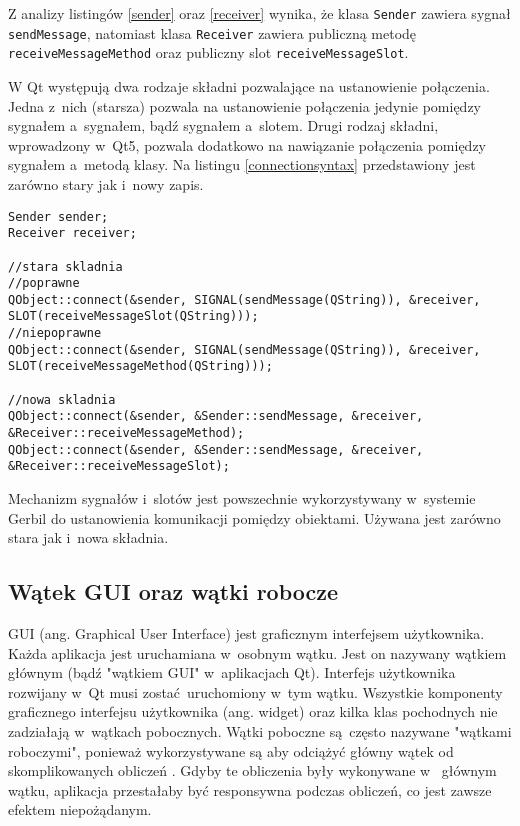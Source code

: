Z analizy listingów \ref{sender} oraz \ref{receiver} wynika, że klasa \lstinline{Sender} zawiera sygnał \lstinline{sendMessage}, natomiast klasa \lstinline{Receiver} zawiera publiczną metodę \lstinline{receiveMessageMethod} oraz publiczny slot \lstinline{receiveMessageSlot}.

W Qt występują dwa rodzaje składni pozwalające na ustanowienie połączenia. Jedna z~nich (starsza) pozwala na ustanowienie połączenia jedynie pomiędzy sygnałem a~sygnałem, bądź sygnałem a~slotem. Drugi rodzaj składni, wprowadzony w~Qt5, pozwala dodatkowo na nawiązanie połączenia pomiędzy sygnałem a~metodą klasy. Na listingu \ref{connectionsyntax} przedstawiony jest zarówno stary jak i~nowy zapis.

\begin{minipage}{\textwidth}
	\begin{lstlisting}[label=connectionsyntax, caption={Składnia tworzenia połączeń między obiektami},alsoletter={()[].=}]
Sender sender;
Receiver receiver;

//stara skladnia
//poprawne
QObject::connect(&sender, SIGNAL(sendMessage(QString)), &receiver, SLOT(receiveMessageSlot(QString)));
//niepoprawne
QObject::connect(&sender, SIGNAL(sendMessage(QString)), &receiver, SLOT(receiveMessageMethod(QString)));

//nowa skladnia
QObject::connect(&sender, &Sender::sendMessage, &receiver, &Receiver::receiveMessageMethod);
QObject::connect(&sender, &Sender::sendMessage, &receiver, &Receiver::receiveMessageSlot);
	\end{lstlisting}
\end{minipage}

Mechanizm sygnałów i~slotów jest powszechnie wykorzystywany w~systemie Gerbil do ustanowienia komunikacji pomiędzy obiektami. Używana jest zarówno stara jak i~nowa składnia.

\subsection{Wątek GUI oraz wątki robocze}
GUI (ang. Graphical User Interface) jest graficznym interfejsem użytkownika. Każda aplikacja jest uruchamiana w~osobnym wątku. Jest on nazywany wątkiem głównym (bądź "wątkiem GUI" w~aplikacjach Qt). Interfejs użytkownika rozwijany w~Qt musi zostać uruchomiony w~tym wątku. Wszystkie komponenty graficznego interfejsu użytkownika (ang. widget) oraz kilka klas pochodnych nie zadziałają w~wątkach pobocznych. Wątki poboczne są często nazywane "wątkami roboczymi", ponieważ wykorzystywane są aby odciążyć główny wątek od skomplikowanych obliczeń \cite{Qtdoc}. Gdyby te obliczenia były wykonywane w~ głównym wątku, aplikacja przestałaby być responsywna podczas obliczeń, co jest zawsze efektem niepożądanym.

